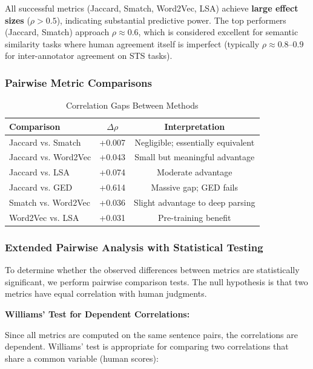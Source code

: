 \documentclass[11pt,a4paper]{article}
\begin{document}
All successful metrics (Jaccard, Smatch, Word2Vec, LSA) achieve \textbf{large effect sizes} ($\rho > 0.5$), indicating substantial predictive power. The top performers (Jaccard, Smatch) approach $\rho \approx 0.6$, which is considered excellent for semantic similarity tasks where human agreement itself is imperfect (typically $\rho \approx 0.8$--$0.9$ for inter-annotator agreement on STS tasks).

\subsubsection{Pairwise Metric Comparisons}

\begin{table}[h]
\centering
\caption{Correlation Gaps Between Methods}
\begin{tabular}{lcc}
\toprule
\textbf{Comparison} & \textbf{$\Delta\rho$} & \textbf{Interpretation} \\
\midrule
Jaccard vs. Smatch & +0.007 & Negligible; essentially equivalent \\
Jaccard vs. Word2Vec & +0.043 & Small but meaningful advantage \\
Jaccard vs. LSA & +0.074 & Moderate advantage \\
Jaccard vs. GED & +0.614 & Massive gap; GED fails \\
\midrule
Smatch vs. Word2Vec & +0.036 & Slight advantage to deep parsing \\
Word2Vec vs. LSA & +0.031 & Pre-training benefit \\
\bottomrule
\end{tabular}
\end{table}

\subsubsection{Extended Pairwise Analysis with Statistical Testing}

To determine whether the observed differences between metrics are statistically significant, we perform pairwise comparison tests. The null hypothesis is that two metrics have equal correlation with human judgments.

\textbf{Williams' Test for Dependent Correlations:}

Since all metrics are computed on the same sentence pairs, the correlations are dependent. Williams' test \cite{williams1959} is appropriate for comparing two correlations that share a common variable (human scores):
\end{document}
